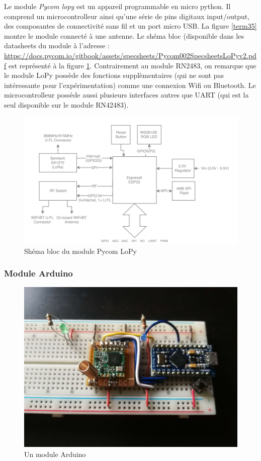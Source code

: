 Le module \textit{Pycom lopy}\cite{sitepycom} est un appareil programmable en micro python. Il comprend un microcontrolleur ainsi qu'une série de pins digitaux input/output,  des composantes de connectivité sans fil et un port micro USB. La figure \ref{term35} montre le module  connecté à une antenne. Le shéma bloc (disponible dans les datasheets du module à l'adresse : \href{https://docs.pycom.io/gitbook/assets/specsheets/Pycom_002_Specsheets_LoPy_v2.pdf}{https://docs.pycom.io/gitbook/assets/specsheets/Pycom002SpecsheetsLoPyv2.pdf} est représenté à la figure \ref{term3003}. Contrairement au module RN2483, on remarque que le module LoPy possède des fonctions supplèmentaires 
(qui ne sont pas intéressante pour l'expérimentation) comme une connexion Wifi ou Bluetooth. Le microcontrolleur possède aussi plusieurs interfaces autres que UART (qui est la seul disponible sur le module RN42483).
\begin{figure}[h]
\centering

\includegraphics[scale=1]{images/SBlopy.png}
\caption{Shéma bloc du module Pycom LoPy}\label{term3003}
\end{figure}

\subsubsection{Module Arduino}\label{arduino}

\begin{figure}[h]
\centering

\includegraphics[scale=0.08]{images/arduino.png}
\caption{Un module Arduino}\label{term36}
\end{figure}


